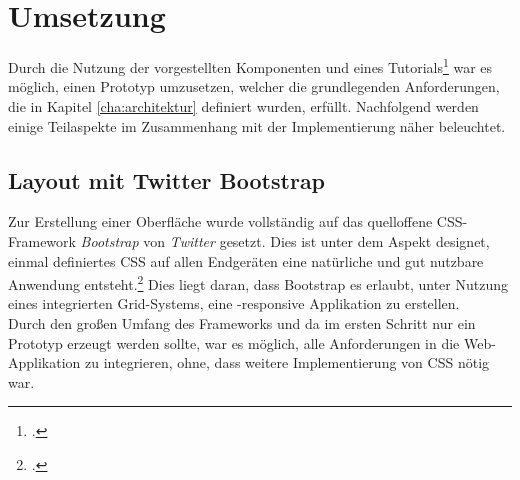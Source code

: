 \section{Umsetzung}
\label{sec:SPA-Umsetzung}
Durch die Nutzung der vorgestellten Komponenten und eines Tutorials\footcite{online:Created_SPA} war es möglich, einen Prototyp umzusetzen, welcher die grundlegenden Anforderungen, die in Kapitel \ref{cha:architektur} definiert wurden, erfüllt. Nachfolgend werden einige Teilaspekte im Zusammenhang mit der Implementierung näher beleuchtet.
\subsection{Layout mit Twitter Bootstrap}
\label{ssec:SPA-twitter-bootstrap}
Zur Erstellung einer Oberfläche wurde vollständig auf das quelloffene \linebreak \ac{CSS}-Framework \textit{Bootstrap} von \textit{Twitter} gesetzt. Dies ist unter dem Aspekt designet, einmal definiertes \ac{CSS} auf allen Endgeräten eine natürliche und gut nutzbare Anwendung entsteht.\footcite{online:get-bootstrap} Dies liegt daran, dass Bootstrap es erlaubt, unter Nutzung eines integrierten Grid-Systems, eine -\gls{responsiv}e Applikation zu erstellen.\\
Durch den großen Umfang des Frameworks und da im ersten Schritt nur ein Prototyp erzeugt werden sollte, war es möglich, alle Anforderungen in die Web-Applikation zu integrieren, ohne, dass weitere Implementierung von \ac{CSS} nötig war.

